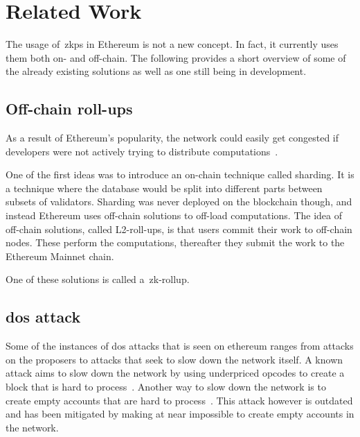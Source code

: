 

\section{Related Work}\label{sec:related-work}
The usage of~\glspl{zkp} in Ethereum is not a new concept.
In fact, it currently uses them both on- and off-chain.
The following provides a short overview of some of the already existing solutions as well as one still being in development.

\subsection{Off-chain roll-ups}\label{subsec:off-chain-roll-ups}
As a result of Ethereum's popularity, the network could easily get congested if developers were not actively trying to distribute computations~\cite{EthereumScaling2024}.

One of the first ideas was to introduce an on-chain technique called sharding.
It is a technique where the database would be split into different parts between subsets of validators.
Sharding was never deployed on the blockchain though, and instead Ethereum uses off-chain solutions to off-load computations.
The idea of off-chain solutions, called L2-roll-ups, is that users commit their work to off-chain nodes.
These perform the computations, thereafter they submit the work to the Ethereum Mainnet chain.

One of these solutions is called a~\gls{zk-rollup}.

\subsection{dos attack}\label{subsec:dos-attack}
Some of the instances of dos attacks that is seen on ethereum ranges from attacks on the proposers to attacks that seek to slow down the network itself.
A known attack aims to slow down the network by using underpriced opcodes to create a block that is hard to process~\cite{10.1145/3391195,9815256}.
Another way to slow down the network is to create empty accounts that are hard to process~\cite{empty-account-mitigation,empty-account-eip-mitigation}.
This attack however is outdated and has been mitigated by making at near impossible to create empty accounts in the network.

